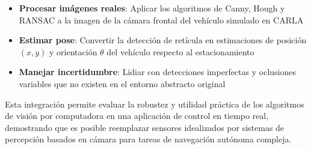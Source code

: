 \begin{itemize}
    \item \textbf{Procesar imágenes reales}: Aplicar los algoritmos de Canny, Hough y RANSAC
    a la imagen de la cámara frontal del vehículo simulado en CARLA
    \item \textbf{Estimar pose}: Convertir la detección de retícula en estimaciones de
    posición $(x,y)$ y orientación $\theta$ del vehículo respecto al estacionamiento
    \item \textbf{Manejar incertidumbre}: Lidiar con detecciones imperfectas y oclusiones
    variables que no existen en el entorno abstracto original
\end{itemize}


Esta integración permite evaluar la robustez y utilidad práctica de los algoritmos
de visión por computadora en una aplicación de control en tiempo real, demostrando
que es posible reemplazar sensores idealizados por sistemas de percepción basados
en cámara para tareas de navegación autónoma compleja.
